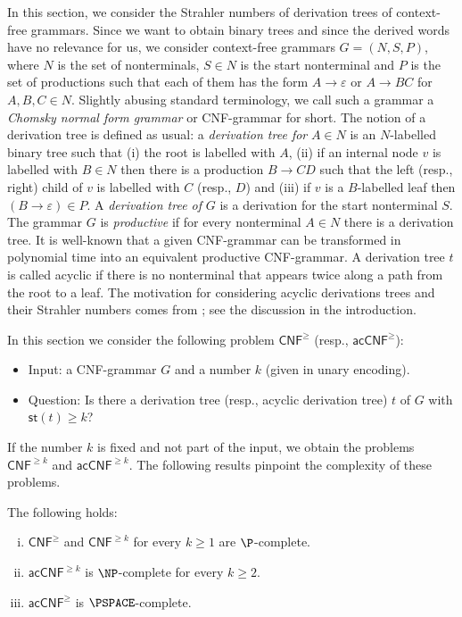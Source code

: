 \documentclass[a4paper,UKenglish,cleveref, autoref, thm-restate, numberwithinsect]{lipics-v2021}
\newcommand{\hs}{\mathsf{st}}
\newcommand{\CNF}{\mathsf{CNF}}
\newcommand{\acCNF}{\mathsf{acCNF}}
\newcommand{\CNFac}{\acCNF^\ge}
\newcommand{\CNFack}{\acCNF^{\ge k}}
\begin{document}
In this section, we consider the Strahler numbers of derivation trees of 
context-free grammars. 
Since we want to obtain binary trees and since the derived words have no relevance for us,
we consider context-free grammars $G = (N,S,P)$, where $N$ is the set of nonterminals, $S \in N$ is the start nonterminal
and $P$ is the set of productions such that each of them has the form $A \to \varepsilon$ or $A \to BC$ for $A,B,C \in N$.
Slightly abusing standard terminology, we call such a grammar a \emph{Chomsky normal form grammar} or CNF-grammar for short.
The notion of a derivation tree is defined as usual: a \emph{derivation tree for} $A \in N$ 
is an $N$-labelled binary tree such that (i) the root is labelled with $A$,
(ii) if an internal  node $v$ is labelled with $B \in N$
then there is a production $B \to CD$ such that the left (resp., right) child of $v$ is labelled with $C$ (resp., $D$) and (iii)
if $v$ is a $B$-labelled leaf then $(B \to \varepsilon) \in P$. A \emph{derivation tree of} $G$ is a derivation for the start nonterminal $S$.
The grammar $G$ is \emph{productive} if for every nonterminal $A \in N$ there is a derivation tree.
It is well-known that a given CNF-grammar can be transformed in polynomial time into an equivalent 
productive CNF-grammar. 
A derivation tree $t$ is called acyclic if there is no nonterminal that appears twice
along a path from the root to a leaf. The motivation for considering acyclic derivations trees and their Strahler numbers comes
from \cite{LRZ25}; see the discussion in the introduction.

In this section we consider the following problem $\CNF^\ge$ (resp., $\acCNF^\ge$):
\begin{itemize}
\item Input: a CNF-grammar $G$ and a number $k$ (given in unary encoding).
\item Question:  Is there a derivation tree (resp., acyclic derivation tree)  $t$ of $G$ with $\hs(t) \geq k$? 
\end{itemize}
If the number $k$ is fixed and not part of the input, we obtain the problems $\CNF^{\ge k}$ and $\acCNF^{\ge k}$.
The following results pinpoint the complexity of these problems.

\begin{theorem} \label{thm-CNF}
The following holds:
\begin{enumerate}[(i)]
\item
$\CNF^\ge$ and $\CNF^{\ge k}$ for every $k \geq 1$ are $\P$-complete.
\item $\CNFack$ is $\NP$-complete for every $k \geq 2$.
\item $\CNFac$ is $\PSPACE$-complete.
\end{enumerate}
\end{theorem}
\end{document}
